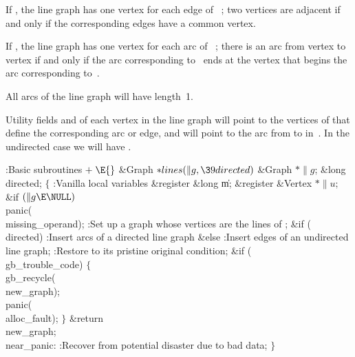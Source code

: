 If , the line graph has one vertex for each edge of~%
;
two vertices are adjacent if and only if the corresponding edges
have a common vertex.

If , the line graph has one vertex for each arc of~%
;
there is an arc from vertex  to vertex  if and only if the
arc corresponding to~ ends at the vertex that begins the arc
corresponding to~.

All arcs of the line graph will have length~1.

Utility fields  and  of each vertex in the line
graph will point to
the vertices of  that define the corresponding arc or edge, and  will
point to the arc from  to  in~. In the
undirected case we will
have .

\Y\B\4:Basic subroutines\X${}\mathrel+\E{}$\6
\1\1\&{Graph} ${}{*}\\{lines}(\|g,\39\\{directed}){}$\6
\&{Graph} ${}{*}\|g{}$;\6
\&{long} \\{directed};\2\2\6
${}\{{}$\5
\1:Vanilla local variables\X\5
\hbox{}\6{}\&{register} \&{long} \|m;\6
\&{register} \&{Vertex} ${}{*}\|u;{}$\7
\&{if} ${}(\|g\E\NULL){}$\1\5
\\{panic}(\\{missing\_operand});\2\6
:Set up a graph whose vertices are the lines of \X;\6
\&{if} (\\{directed})\1\5
:Insert arcs of a directed line graph\X\2\6
\&{else}\1\5
:Insert edges of an undirected line graph\X;\2\6
:Restore  to its pristine original condition\X;\6
\&{if} (\\{gb\_trouble\_code})\5
${}\{{}$\1\6
\\{gb\_recycle}(\\{new\_graph});\6
\\{panic}(\\{alloc\_fault});\6
\4${}\}{}$\2\6
\&{return} \\{new\_graph};\6
\4\\{near\_panic}:\5
:Recover from potential disaster due to bad data\X;\6
\4${}\}{}$\2\par
\fi

